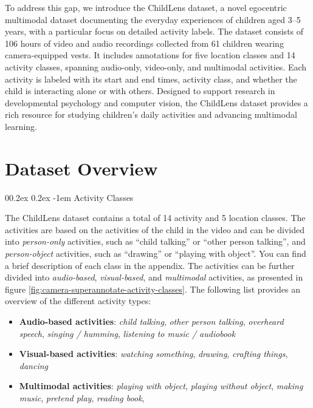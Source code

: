 \documentclass[
  man,floatsintext]{apa6}
\makeatletter
\providecommand{\tightlist}{%
  \setlength{\itemsep}{0pt}\setlength{\parskip}{0pt}}
\let\oldparagraph\paragraph
\renewcommand{\paragraph}{
    \@ifstar
      \xxxParagraphStar
      \xxxParagraphNoStar
  }
\newcommand{\xxxParagraphStar}[1]{\oldparagraph*{#1}\mbox{}}
\newcommand{\xxxParagraphNoStar}[1]{\oldparagraph{#1}\mbox{}}
\renewcommand{\paragraph}{\@startsection{paragraph}{4}{\parindent}%
  {0\baselineskip \@plus 0.2ex \@minus 0.2ex}%
  {-1em}%
  {\normalfont\normalsize\bfseries\itshape\typesectitle}}
\makeatother
\begin{document}
To address this gap, we introduce the ChildLens dataset, a novel egocentric multimodal dataset documenting the everyday experiences of children aged 3--5 years, with a particular focus on detailed activity labels. The dataset consists of 106 hours of video and audio recordings collected from 61 children wearing camera-equipped vests. It includes annotations for five location classes and 14 activity classes, spanning audio-only, video-only, and multimodal activities. Each activity is labeled with its start and end times, activity class, and whether the child is interacting alone or with others. Designed to support research in developmental psychology and computer vision, the ChildLens dataset provides a rich resource for studying children's daily activities and advancing multimodal learning.

\section{Dataset Overview}\label{dataset-overview}

\paragraph{Activity Classes}\label{activity-classes}

The ChildLens dataset contains a total of 14 activity and 5 location classes. The activities are based on the activities of the child in the video and can be divided into \emph{person-only} activities, such as ``child talking'' or ``other person talking'', and \emph{person-object} activities, such as ``drawing'' or ``playing with object''. You can find a brief description of each class in the appendix. The activities can be further divided into \emph{audio-based}, \emph{visual-based}, and \emph{multimodal} activities, as presented in figure \ref{fig:camera-superannotate-activity-classes}. The following list provides an overview of the different activity types:

\begin{itemize}
\tightlist
\item
  \textbf{Audio-based activities}: \emph{child talking}, \emph{other person talking}, \emph{overheard speech}, \emph{singing / humming}, \emph{listening to music / audiobook}
\item
  \textbf{Visual-based activities}: \emph{watching something}, \emph{drawing}, \emph{crafting things}, \emph{dancing}
\item
  \textbf{Multimodal activities}: \emph{playing with object}, \emph{playing without object}, \emph{making music}, \emph{pretend play}, \emph{reading book},
\end{itemize}
\end{document}
